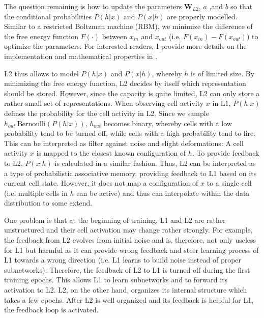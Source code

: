 The question remaining is how to update the parameters $\boldsymbol{W}_{L2}$, $a$ ,and $b$ so that the conditional probabilities $P(h|x)$ and $P(x|h)$ are properly modelled.
Similar to a restricted Boltzman machine (RBM), we minimize the difference of the free energy function $F(\cdot)$ between $x_{in}$ and $x_{out}$ (i.e. $F(x_{in}) - F(x_{out})$) to optimize the parameters. For interested readers, I provide more details on the implementation and mathematical properties in .

L2 thus allows to model $P(h|x)$ and $P(x|h)$, whereby $h$ is of limited size.
By minimizing the free energy function, L2 decides by itself which representation should be stored.
However, since the capacity is quite limited, L2 can only store a rather small set of representations.
When observing cell activity $x$ in L1, $P(h|x)$ defines the probability for the cell activity in L2. Since we sample $h_{out} ~ \text{Bernoulli}(P(h | x) )$, $h_{out}$ becomes binary, whereby cells with a low probability tend to be turned off, while cells with a high probability tend to fire.
This can be interpreted as filter against noise and slight deformations: A cell activity $x$ is mapped to the closest known configuration of $h$.
To provide feedback to L2, $P(x|h)$ is calculated in a similar fashion. Thus, L2 can be interpreted as a type of probabilistic associative memory, providing feedback to L1 based on its current cell state.
However, it does not map a configuration of $x$ to a single cell (i.e. multiple cells in $h$ can be active) and thus can interpolate within the data distribution to some extend.

One problem is that at the beginning of training, L1 and L2 are rather unstructured and their cell activation may change rather strongly.
For example, the feedback from L2 evolves from initial noise and is, therefore, not only useless for L1 but harmful as it can provide wrong feedback and steer learning process of L1 towards a wrong direction (i.e. L1 learns to build noise instead of proper subnetworks).
Therefore, the feedback of L2 to L1 is turned off during the first training epochs.
This allows L1 to learn subnetworks and to forward its activation to L2. L2, on the other hand, organizes its internal structure which takes a few epochs.
After L2 is well organized and its feedback is helpful for L1, the feedback loop is activated.



